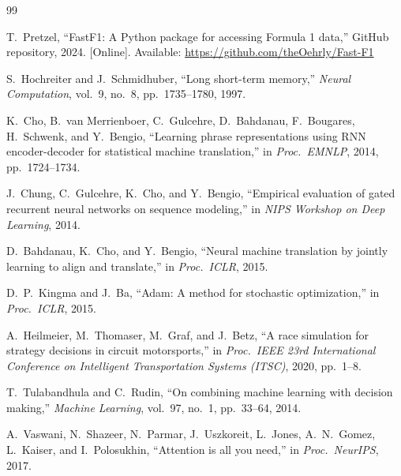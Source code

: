 \begin{thebibliography}{99}

T.\ Pretzel, ``FastF1: A Python package for accessing Formula 1 data,'' GitHub repository, 2024. [Online]. Available: \url{https://github.com/theOehrly/Fast-F1}

S.\ Hochreiter and J.\ Schmidhuber, ``Long short-term memory,'' \textit{Neural Computation}, vol.\ 9, no.\ 8, pp.\ 1735--1780, 1997.

K.\ Cho, B.\ van Merrienboer, C.\ Gulcehre, D.\ Bahdanau, F.\ Bougares, H.\ Schwenk, and Y.\ Bengio, ``Learning phrase representations using RNN encoder-decoder for statistical machine translation,'' in \textit{Proc.\ EMNLP}, 2014, pp.\ 1724--1734.

J.\ Chung, C.\ Gulcehre, K.\ Cho, and Y.\ Bengio, ``Empirical evaluation of gated recurrent neural networks on sequence modeling,'' in \textit{NIPS Workshop on Deep Learning}, 2014.

D.\ Bahdanau, K.\ Cho, and Y.\ Bengio, ``Neural machine translation by jointly learning to align and translate,'' in \textit{Proc.\ ICLR}, 2015.

D.\ P.\ Kingma and J.\ Ba, ``Adam: A method for stochastic optimization,'' in \textit{Proc.\ ICLR}, 2015.

A.\ Heilmeier, M.\ Thomaser, M.\ Graf, and J.\ Betz, ``A race simulation for strategy decisions in circuit motorsports,'' in \textit{Proc.\ IEEE 23rd International Conference on Intelligent Transportation Systems (ITSC)}, 2020, pp.\ 1--8.

T.\ Tulabandhula and C.\ Rudin, ``On combining machine learning with decision making,'' \textit{Machine Learning}, vol.\ 97, no.\ 1, pp.\ 33--64, 2014.

A.\ Vaswani, N.\ Shazeer, N.\ Parmar, J.\ Uszkoreit, L.\ Jones, A.\ N.\ Gomez, L.\ Kaiser, and I.\ Polosukhin, ``Attention is all you need,'' in \textit{Proc.\ NeurIPS}, 2017.

\end{thebibliography}
